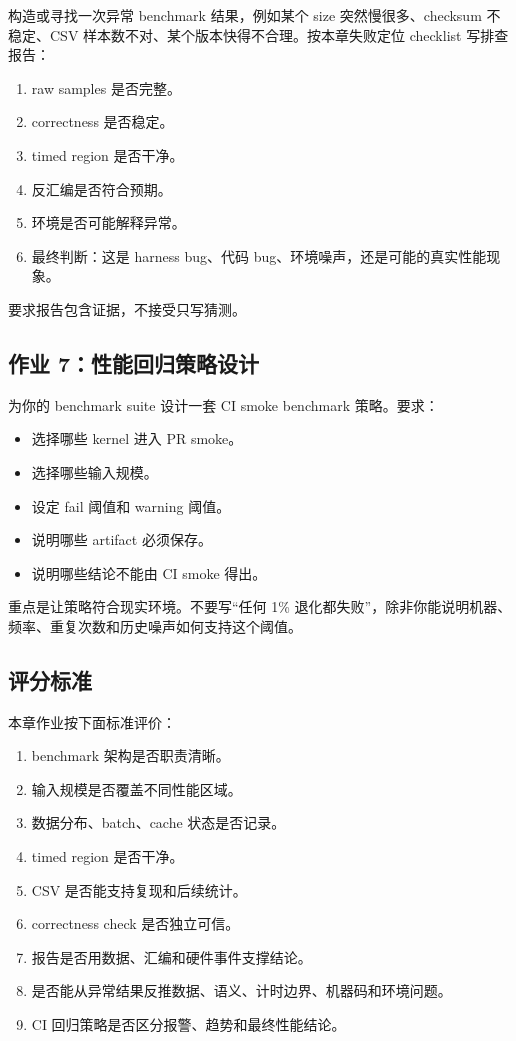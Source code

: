 \begin{exercisebox}
构造或寻找一次异常 benchmark 结果，例如某个 size 突然慢很多、checksum 不稳定、CSV 样本数不对、某个版本快得不合理。按本章失败定位 checklist 写排查报告：

\begin{enumerate}
  \item raw samples 是否完整。
  \item correctness 是否稳定。
  \item timed region 是否干净。
  \item 反汇编是否符合预期。
  \item 环境是否可能解释异常。
  \item 最终判断：这是 harness bug、代码 bug、环境噪声，还是可能的真实性能现象。
\end{enumerate}

要求报告包含证据，不接受只写猜测。

\subsection*{作业 7：性能回归策略设计}

为你的 benchmark suite 设计一套 CI smoke benchmark 策略。要求：

\begin{itemize}
  \item 选择哪些 kernel 进入 PR smoke。
  \item 选择哪些输入规模。
  \item 设定 fail 阈值和 warning 阈值。
  \item 说明哪些 artifact 必须保存。
  \item 说明哪些结论不能由 CI smoke 得出。
\end{itemize}

重点是让策略符合现实环境。不要写“任何 1\% 退化都失败”，除非你能说明机器、频率、重复次数和历史噪声如何支持这个阈值。

\subsection*{评分标准}

本章作业按下面标准评价：

\begin{enumerate}
  \item benchmark 架构是否职责清晰。
  \item 输入规模是否覆盖不同性能区域。
  \item 数据分布、batch、cache 状态是否记录。
  \item timed region 是否干净。
  \item CSV 是否能支持复现和后续统计。
  \item correctness check 是否独立可信。
  \item 报告是否用数据、汇编和硬件事件支撑结论。
  \item 是否能从异常结果反推数据、语义、计时边界、机器码和环境问题。
  \item CI 回归策略是否区分报警、趋势和最终性能结论。
\end{enumerate}
\end{exercisebox}

